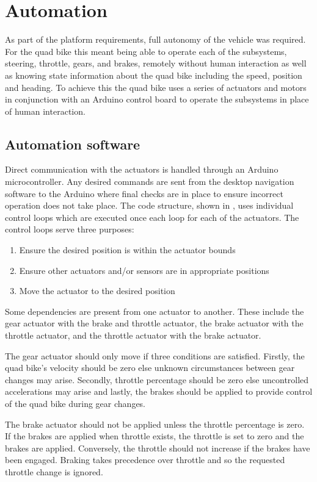 \documentclass[main.tex]{subfiles}
\begin{document}
\section{Automation}

As part of the platform requirements, full autonomy of the vehicle was required. For the quad bike this meant being able to operate each of the subsystems, steering, throttle, gears, and brakes, remotely without human interaction as well as knowing state information about the quad bike including the speed, position and heading. To achieve this the quad bike uses a series of actuators and motors in conjunction with an Arduino control board to operate the subsystems in place of human interaction.

\subsection{Automation software}
Direct communication with the actuators is handled through an Arduino microcontroller. Any desired commands are sent from the desktop navigation software to the Arduino where final checks are in place to ensure incorrect operation does not take place. The code structure, shown in , uses individual control loops which are executed once each loop for each of the actuators. The control loops serve three purposes:
\begin{enumerate}
\item Ensure the desired position is within the actuator bounds
\item Ensure other actuators and/or sensors are in appropriate positions
\item Move the actuator to the desired position
\end{enumerate}
Some dependencies are present from one actuator to another. These include the gear actuator with the brake and throttle actuator, the brake actuator with the throttle actuator, and the throttle actuator with the brake actuator.

The gear actuator should only move if three conditions are satisfied. Firstly, the quad bike's velocity should be zero else unknown circumstances between gear changes may arise. Secondly, throttle percentage should be zero else uncontrolled accelerations may arise and lastly, the brakes should be applied to provide control of the quad bike during gear changes.

The brake actuator should not be applied unless the throttle percentage is zero. If the brakes are applied when throttle exists, the throttle is set to zero and the brakes are applied. Conversely, the throttle should not increase if the brakes have been engaged. Braking takes precedence over throttle and so the requested throttle change is ignored.
\end{document}
